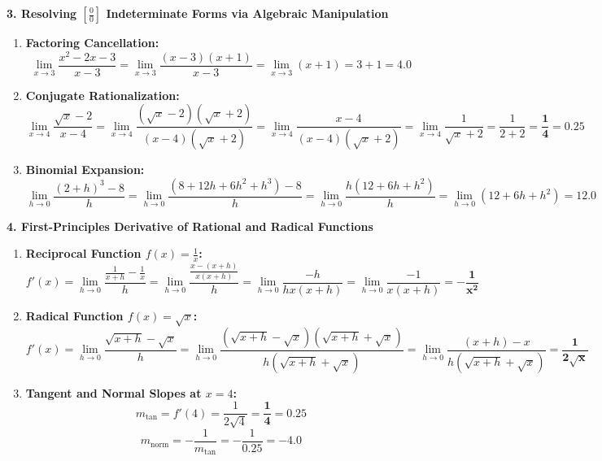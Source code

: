 \textbf{3. Resolving $\left[\frac{0}{0}\right]$ Indeterminate Forms via Algebraic Manipulation}
\begin{enumerate}
    \item \textbf{Factoring Cancellation:}
    $$\lim_{x \to 3} \frac{x^2 - 2x - 3}{x - 3} = \lim_{x \to 3} \frac{(x - 3)(x + 1)}{x - 3} = \lim_{x \to 3} (x + 1) = 3 + 1 = \mathbf{4.0}$$
    \item \textbf{Conjugate Rationalization:}
    $$\lim_{x \to 4} \frac{\sqrt{x} - 2}{x - 4} = \lim_{x \to 4} \frac{(\sqrt{x} - 2)(\sqrt{x} + 2)}{(x - 4)(\sqrt{x} + 2)} = \lim_{x \to 4} \frac{x - 4}{(x - 4)(\sqrt{x} + 2)} = \lim_{x \to 4} \frac{1}{\sqrt{x} + 2} = \frac{1}{2 + 2} = \mathbf{\frac{1}{4} = 0.25}$$
    \item \textbf{Binomial Expansion:}
    $$\lim_{h \to 0} \frac{(2 + h)^3 - 8}{h} = \lim_{h \to 0} \frac{(8 + 12h + 6h^2 + h^3) - 8}{h} = \lim_{h \to 0} \frac{h(12 + 6h + h^2)}{h} = \lim_{h \to 0} (12 + 6h + h^2) = \mathbf{12.0}$$
\end{enumerate}

\textbf{4. First-Principles Derivative of Rational and Radical Functions}
\begin{enumerate}
    \item \textbf{Reciprocal Function $f(x) = \frac{1}{x}$:}
    $$f'(x) = \lim_{h \to 0} \frac{\frac{1}{x+h} - \frac{1}{x}}{h} = \lim_{h \to 0} \frac{\frac{x - (x+h)}{x(x+h)}}{h} = \lim_{h \to 0} \frac{-h}{h x(x + h)} = \lim_{h \to 0} \frac{-1}{x(x + h)} = \mathbf{-\frac{1}{x^2}}$$
    \item \textbf{Radical Function $f(x) = \sqrt{x}$:}
    $$f'(x) = \lim_{h \to 0} \frac{\sqrt{x+h} - \sqrt{x}}{h} = \lim_{h \to 0} \frac{(\sqrt{x+h} - \sqrt{x})(\sqrt{x+h} + \sqrt{x})}{h(\sqrt{x+h} + \sqrt{x})} = \lim_{h \to 0} \frac{(x + h) - x}{h(\sqrt{x+h} + \sqrt{x})} = \mathbf{\frac{1}{2\sqrt{x}}}$$
    \item \textbf{Tangent and Normal Slopes at $x = 4$:}
    $$m_{\text{tan}} = f'(4) = \frac{1}{2\sqrt{4}} = \mathbf{\frac{1}{4} = 0.25}$$
    $$m_{\text{norm}} = -\frac{1}{m_{\text{tan}}} = -\frac{1}{0.25} = \mathbf{-4.0}$$
\end{enumerate}

